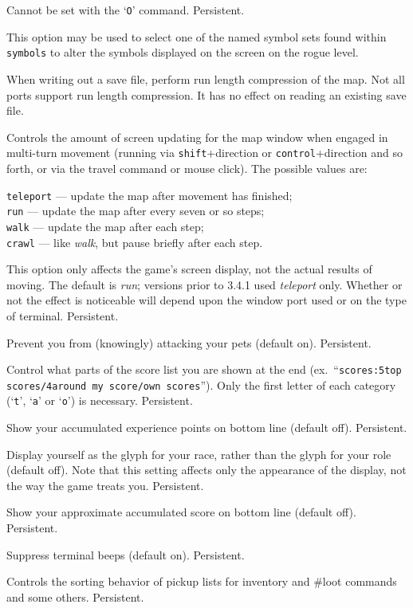 Cannot be set with the `{\tt O}' command.  Persistent.
\item[\ib{roguesymset}]
This option may be used to select one of the named symbol sets found within
{\tt symbols} to alter the symbols displayed on the screen on the
rogue level.
\item[\ib{rlecomp}]
When writing out a save file, perform run length compression of the map.
Not all ports support run length compression. It has no
effect on reading an existing save file.
\item[\ib{runmode}]
Controls the amount of screen updating for the map window when engaged
in multi-turn movement (running via {\tt shift}+direction
or {\tt control}+direction
and so forth, or via the travel command or mouse click).
The possible values are:

{\tt teleport} --- update the map after movement has finished;\\
{\tt run} --- update the map after every seven or so steps;\\
{\tt walk} --- update the map after each step;\\
{\tt crawl} --- like {\it walk\/}, but pause briefly after each step.

This option only affects the game's screen display, not the actual
results of moving.  The default is {\it run\/}; versions prior to 3.4.1 
used {\it teleport\/} only.  Whether or not the effect is noticeable will
depend upon the window port used or on the type of terminal.  Persistent.
\item[\ib{safe\verb+_+pet}]
Prevent you from (knowingly) attacking your pets (default on).  Persistent.
\item[\ib{scores}]
Control what parts of the score list you are shown at the end (ex.\
``{\tt scores:5top scores/4around my score/own scores}'').  Only the first
letter of each category (`{\tt t}', `{\tt a}' or `{\tt o}') is necessary.
Persistent.
\item[\ib{showexp}]
Show your accumulated experience points on bottom line (default off).
Persistent.
\item[\ib{showrace}]
Display yourself as the glyph for your race, rather than the glyph
for your role (default off).  Note that this setting affects only
the appearance of the display, not the way the game treats you.
Persistent.
\item[\ib{showscore}]
Show your approximate accumulated score on bottom line (default off).
Persistent.
\item[\ib{silent}]
Suppress terminal beeps (default on).  Persistent.
\item[\ib{sortloot}]
Controls the sorting behavior of pickup lists for inventory
and \#loot commands and some others.  Persistent.

